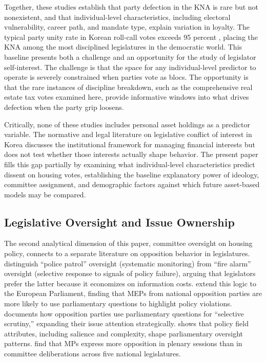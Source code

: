 \documentclass[11pt]{article}
\begin{document}
Together, these studies establish that party defection in the KNA is rare but not nonexistent, and that individual-level characteristics, including electoral vulnerability, career path, and mandate type, explain variation in loyalty. The typical party unity rate in Korean roll-call votes exceeds 95 percent \citep{shinLee2015}, placing the KNA among the most disciplined legislatures in the democratic world. This baseline presents both a challenge and an opportunity for the study of legislator self-interest. The challenge is that the space for any individual-level predictor to operate is severely constrained when parties vote as blocs. The opportunity is that the rare instances of discipline breakdown, such as the comprehensive real estate tax votes examined here, provide informative windows into what drives defection when the party grip loosens.

Critically, none of these studies includes personal asset holdings as a predictor variable. The normative and legal literature on legislative conflict of interest in Korea \citep{cho2021, haLee2023} discusses the institutional framework for managing financial interests but does not test whether those interests actually shape behavior. The present paper fills this gap partially by examining what individual-level characteristics predict dissent on housing votes, establishing the baseline explanatory power of ideology, committee assignment, and demographic factors against which future asset-based models may be compared.

\subsection{Legislative Oversight and Issue Ownership}

The second analytical dimension of this paper, committee oversight on housing policy, connects to a separate literature on opposition behavior in legislatures. \citet{mccubbinsSchwartz1984} distinguish ``police patrol'' oversight (systematic monitoring) from ``fire alarm'' oversight (selective response to signals of policy failure), arguing that legislators prefer the latter because it economizes on information costs. \citet{jensen2013} extend this logic to the European Parliament, finding that MEPs from national opposition parties are more likely to use parliamentary questions to highlight policy violations. \citet{senninger2016} documents how opposition parties use parliamentary questions for ``selective scrutiny,'' expanding their issue attention strategically. \citet{bundi2018} shows that policy field attributes, including salience and complexity, shape parliamentary oversight patterns. \citet{karlsson2022} find that MPs express more opposition in plenary sessions than in committee deliberations across five national legislatures.
\end{document}
